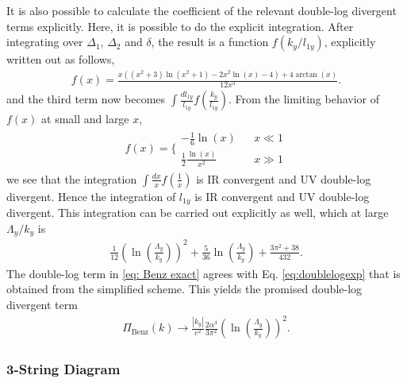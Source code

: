 \documentclass[prx,amsmath,amssymb, notitlepage, onecolumn,
nofootinbib,
superscriptaddress,
longbibliography
]{revtex4-1}
\newcommand{\beq}{\begin{eqnarray}}
\newcommand{\eeq}{\end{eqnarray}}
\begin{document}
It is also possible to 
calculate the coefficient of the relevant double-log divergent terms explicitly.
Here, it is possible to do the explicit integration. 
After integrating over $\Delta_1$, $\Delta_2$ and $\delta$, the result is a function $f(k_y/l_{1y})$, explicitly written out as follows,
\beq
f(x) = \frac{x  \left(\left(x ^2+3\right) \ln \left(x ^2+1\right) -2x^2\ln (x )-4\right)+4 \arctan(x )}{12 x ^3}.
\eeq
and the third term now becomes $\int\frac{dl_{1y}}{l_{1y}}f\left(\frac{k_y}{l_{1y}}\right)$. From the limiting behavior of $f(x)$ at small and large $x$, 
\beq
f(x)=\Bigg\{
\begin{array}{rcl}
-\frac{1}{6}\ln(x) & & x\ll 1\\
\frac{1}{2}\frac{\ln(x)}{x^2} & & x\gg 1
\end{array} 
\eeq
we see that the integration $\int \frac{dx}{x} f(\frac{1}{x})$ is IR convergent and UV double-log divergent. Hence the integration of $l_{1y}$ is IR convergent and UV double-log divergent. This integration can be carried out explicitly as well, which at large $\Lambda_y/k_y$ is 
\beq 
\label{eq: Benz exact}
\frac{1}{12}\left(\ln\left(\frac{\Lambda_y}{k_y}\right)\right)^2 + \frac{5}{36}\ln\left(\frac{\Lambda_y}{k_y}\right) + \frac{3\pi^2+38}{432}.
\eeq
The double-log term 
in \eqref{eq: Benz exact}
agrees with Eq.  \eqref{eq:doublelogexp} that is obtained from the simplified scheme.
This yields the promised double-log divergent term
\beq\label{eq: double log Benz}
\Pi_{\text{Benz}}(k)\rightarrow \frac{|k_y|}{e^2}\frac{2\alpha^4}{3\pi^2}\left(\ln\left(\frac{\Lambda_y}{k_y}\right)\right)^2.
\eeq


\subsubsection{3-String Diagram}\label{subsubapp: 3string}
\end{document}

